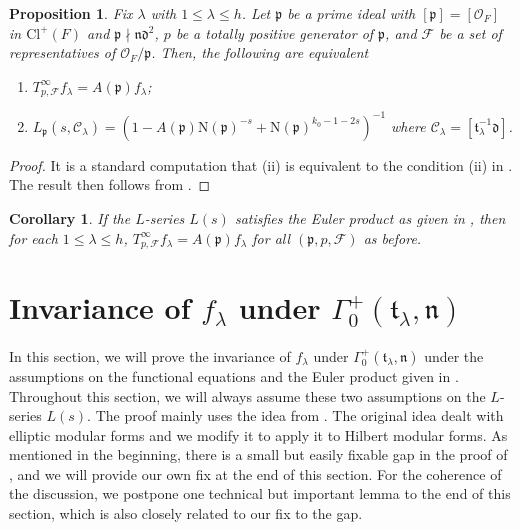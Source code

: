 \documentclass[11pt]{amsart}
\newtheorem{prop}[theorem]{Proposition}
\newtheorem{corol}[theorem]{Corollary}
\theoremstyle{remark}
\newcommand\cl[1]{\mathcal{#1}}
\newcommand\fr[1]{\mathfrak{#1}}
\newcommand{\clo}{\mathcal{O}}
\newcommand{\N}{\mathrm{N}}
\newcommand{\Cl}{\mathrm{Cl}}
\begin{document}
\begin{prop}
\label{localfactoreigenfunction}
Fix $\lambda$ with $1\leq\lambda\leq h$. Let $\fr{p}$ be a prime ideal with $[\fr{p}]=[\clo_F]$ in $\Cl^+(F)$ and $\fr{p}\nmid\fr{n}\fr{d}^2$, $p$ be a totally positive generator of $\fr{p}$, and $\cl{F}$ be a set of representatives of $\clo_F/\fr{p}$. Then, the following are equivalent
\begin{enumerate}[label=\rm{(\roman*)}]
    \item $T_{p,\cl{F}}^\infty f_\lambda=A(\fr{p})f_\lambda$;
    \item $L_\fr{p}(s,\cl{C}_\lambda)=(1-A(\fr{p})\N(\fr{p})^{-s}+\N(\fr{p})^{k_0-1-2s})^{-1}$ where $\cl{C}_\lambda=[\fr{t}_\lambda^{-1}\fr{d}]$.
\end{enumerate}
\end{prop}
\begin{proof}
It is a standard computation that (ii) is equivalent to the condition (ii) in . The result then follows from .
\end{proof}

\begin{corol}
\label{eulercorol}
If the $L$-series $L(s)$ satisfies the Euler product as given in , then for each $1\leq\lambda\leq h$, $T_{p,\cl{F}}^\infty f_\lambda=A(\fr{p})f_\lambda$ for all $(\fr{p},p,\cl{F})$ as before.
\end{corol}

\section{Invariance of $f_\lambda$ under $\Gamma_0^+(\fr{t}_\lambda,\fr{n})$}
\label{gamma0-inv-sect}

In this section, we will prove the invariance of $f_\lambda$ under $\Gamma_0^+(\fr{t}_\lambda,\fr{n})$ under the assumptions on the functional equations and the Euler product given in . Throughout this section, we will always assume these two assumptions on the $L$-series $L(s)$. The proof mainly uses the idea from \cite[Theorem~2.2]{conjhecke}. The original idea dealt with elliptic modular forms and we modify it to apply it to Hilbert modular forms. As mentioned in the beginning, there is a small but easily fixable gap in the proof of \cite[Theorem~2.2]{conjhecke}, and we will provide our own fix at the end of this section. For the coherence of the discussion, we postpone one technical but important lemma to the end of this section, which is also closely related to our fix to the gap.
\end{document}
